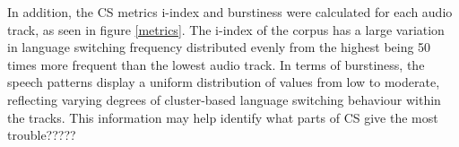 \documentclass[11pt, a4paper]{report}
\begin{document}
\vspace*{10pt}
In addition, the CS metrics i-index and burstiness were calculated for each 
audio track, as seen in figure \ref*{metrics}. The i-index of the corpus 
has a large variation in language switching frequency distributed evenly from 
the highest being 50 times more frequent than the lowest audio track.  In terms 
of burstiness, the speech patterns display a uniform distribution of values 
from low to moderate, reflecting varying degrees of cluster-based language 
switching behaviour within the tracks. This information may help identify 
what parts of CS give the most trouble?????

\vspace*{10pt}

% 
\end{document}

